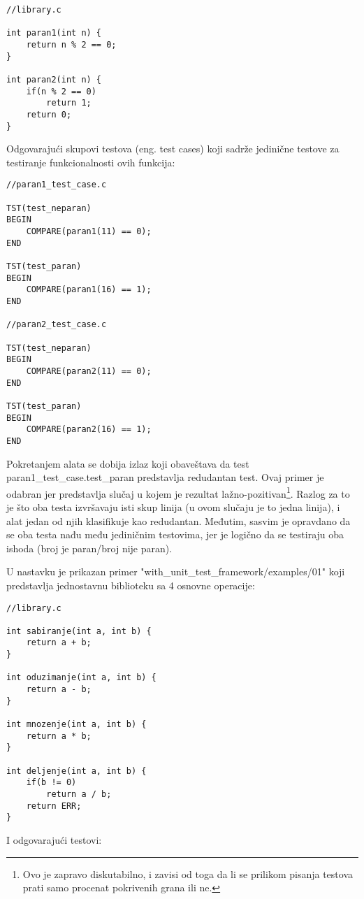 \documentclass[a4paper]{article}
\begin{document}
\begin{lstlisting}
//library.c

int paran1(int n) {
    return n % 2 == 0;
}

int paran2(int n) {
    if(n % 2 == 0)
        return 1;
    return 0;
}
\end{lstlisting}

Odgovarajući skupovi testova (eng. test cases) koji sadrže jedinične testove za testiranje funkcionalnosti ovih funkcija:

\begin{lstlisting}
//paran1_test_case.c

TST(test_neparan)
BEGIN
	COMPARE(paran1(11) == 0);
END

TST(test_paran)
BEGIN
	COMPARE(paran1(16) == 1);
END

//paran2_test_case.c

TST(test_neparan)
BEGIN
	COMPARE(paran2(11) == 0);
END

TST(test_paran)
BEGIN
	COMPARE(paran2(16) == 1);
END

\end{lstlisting}

Pokretanjem alata se dobija izlaz koji obaveštava da test paran1\_test\_case.test\_paran predstavlja redudantan test. Ovaj primer je odabran jer predstavlja slučaj u kojem je rezultat lažno-pozitivan\footnote{Ovo je zapravo diskutabilno, i zavisi od toga da li se prilikom pisanja testova prati samo procenat pokrivenih grana ili ne.}. Razlog za to je što oba testa izvršavaju isti skup linija (u ovom slučaju je to jedna linija), i alat jedan od njih klasifikuje kao redudantan. Međutim, sasvim je opravdano da se oba testa nađu među jediničnim testovima, jer je logično da se testiraju oba ishoda (broj je paran/broj nije paran).

U nastavku je prikazan primer "with\_unit\_test\_framework/examples/01" koji predstavlja jednostavnu biblioteku sa 4 osnovne operacije:

\begin{lstlisting}
//library.c

int sabiranje(int a, int b) {
	return a + b;
}

int oduzimanje(int a, int b) {
	return a - b;
}

int mnozenje(int a, int b) {
	return a * b;
}

int deljenje(int a, int b) {
	if(b != 0)
		return a / b;
	return ERR;
}
\end{lstlisting}

I odgovarajući testovi:
\end{document}
